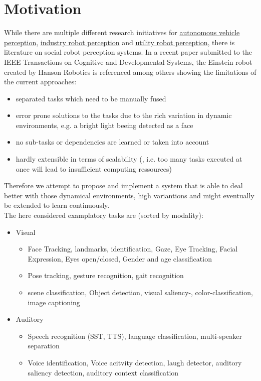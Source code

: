 \section{Motivation}
While there are multiple different research initiatives for \href{https://selfdrivingcars.mit.edu/}{autonomous vehicle perception}, \href{https://spectrum.ieee.org/automaton/robotics/robotics-hardware/startup-spotlight-industrial-perception}{industry robot perception} and \href{https://www.sciencedirect.com/science/article/pii/S1877050918310536}{utility robot perception}, there is literature on social robot perception systems.
In a recent paper submitted to the IEEE Transactions on Cognitive and Developmental Systems, the Einstein robot created by Hanson Robotics is referenced \cite{7534850} among others showing the limitations of the current approaches: 
\begin{itemize}
    \item separated tasks which need to be manually fused
    \item error prone solutions to the tasks due to the rich variation in dynamic environments, e.g. a bright light beeing detected as a face
    \item no sub-tasks or dependencies are learned or taken into account
    \item hardly extensible in terms of scalability (, i.e. too many tasks executed at once will lead to insufficient computing ressources)
\end{itemize}
Therefore we attempt to propose and implement a system that is able to deal better with those dynamical environments, high variantions and might eventually be extended to learn continuously. \\
The here considered examplatory tasks are (sorted by modality):
\begin{itemize}
    \item Visual
    \begin{itemize}
        \item Face Tracking, landmarks, identification, Gaze, Eye Tracking, Facial Expression, Eyes open/closed, Gender and age classification
        \item Pose tracking, gesture recognition, gait recognition
        \item scene classification, Object detection, visual saliency-, color-classification, image captioning 
    \end{itemize}
    
    \item Auditory
    \begin{itemize}
        \item Speech recognition (SST, TTS), language classification, multi-speaker separation
        \item Voice identification, Voice acitvity detection, laugh detector, auditory saliency detection, auditory context classification
    \end{itemize}
\end{itemize}

